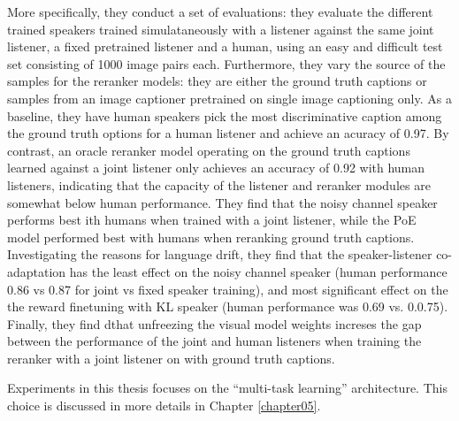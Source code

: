 More specifically, they conduct a set of evaluations: they evaluate the different trained speakers trained simulataneously with a listener against the same joint listener, a fixed pretrained listener and a human, using an easy and difficult test set consisting of 1000 image pairs each. Furthermore, they vary the source of the samples for the reranker models: they are either the ground truth captions or samples from an image captioner pretrained on single image captioning only. As a baseline, they have human speakers pick the most discriminative caption among the ground truth options for a human listener and achieve an acuracy of 0.97. By contrast, an oracle reranker model operating on the ground truth captions learned against a joint listener only achieves an accuracy of 0.92 with human listeners, indicating that the capacity of the listener and reranker modules are somewhat below human performance. They find that the noisy channel speaker performs best ith humans when trained with a joint listener, while the PoE model performed best with humans when reranking ground truth captions. Investigating the reasons for language drift, they find that the speaker-listener co-adaptation has the least effect on the noisy channel speaker (human performance 0.86 vs 0.87 for joint vs fixed speaker training), and most significant effect on the the reward finetuning with KL speaker (human performance was 0.69 vs. 0.0.75). Finally, they find dthat unfreezing the visual model weights increses the gap between the performance of the joint and human listeners when training the reranker with a joint listener on with ground truth captions. 

Experiments in this thesis focuses on the ``multi-task learning'' architecture. This choice is discussed in more details in Chapter \ref{chapter05}.

